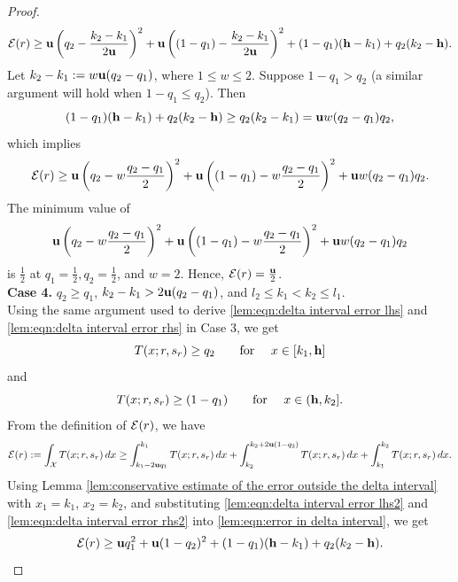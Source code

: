 \begin{proof}
        \[
        \mathcal{E}(r) \geq \mathbf{u} \left(q_2 - \frac{k_2 - k_1}{2\mathbf{u}}\right)^2 + \mathbf{u} \left((1 - q_1) - \frac{k_2 - k_1}{2\mathbf{u}}\right)^2 + (1 - q_1)(\mathbf{h} - k_1) + q_2(k_2 - \mathbf{h}).
        \]
        Let $k_2 - k_1 := w\mathbf{u} (q_2 - q_1)$, where $1 \leq w \leq 2$.
        Suppose $1 - q_1 > q_2$ (a similar argument will hold when $1 - q_1 \leq q_2$). Then
        \[
        (1 - q_1)(\mathbf{h} - k_1) + q_2(k_2 - \mathbf{h}) \geq q_2(k_2 - k_1) = \mathbf{u} w (q_2 - q_1) q_2,
        \]
        which implies
        \[
        \mathcal{E}(r) \geq \mathbf{u} \left(q_2 - w \frac{q_2 - q_1}{2}\right)^2 + \mathbf{u} \left((1 - q_1) - w \frac{q_2 - q_1}{2}\right)^2 + \mathbf{u} w (q_2 - q_1) q_2.
        \]
        The minimum value of
        \[
        \mathbf{u} \left(q_2 - w \frac{q_2 - q_1}{2}\right)^2 + \mathbf{u} \left((1 - q_1) - w \frac{q_2 - q_1}{2}\right)^2 + \mathbf{u} w (q_2 - q_1) q_2
        \]
        is $\frac{1}{2}$ at $q_1 = \frac{1}{2}, q_2 = \frac{1}{2}$, and $w = 2$. Hence, $\mathcal{E}(r) = \frac{\mathbf{u}}{2}$.\\
\textbf{Case 4. }{$q_2 \geq q_1$, $k_2 - k_1 > 2\mathbf{u}(q_2 - q_1)$, and $l_2 \leq k_1 < k_2 \leq l_1$.} \\
        Using the same argument used to derive \eqref{lem:eqn:delta interval error lhs} and \eqref{lem:eqn:delta interval error rhs} in Case 3, we get
        \begin{equation}\label{lem:eqn:delta interval error lhs2}
            T(x; r, s_r) \geq q_2 \quad \hbox{\quad for \quad} x \in [k_1, \mathbf{h}]
        \end{equation}
        and
        \begin{equation}\label{lem:eqn:delta interval error rhs2}
            T(x; r, s_r) \geq (1 - q_1) \quad \hbox{\quad for \quad} x \in (\mathbf{h}, k_2].
        \end{equation}
        From the definition of $\mathcal{E}(r)$, we have
        \begin{equation}\label{lem:eqn:error in delta interval}
            \mathcal{E}(r) := \int_{\mathcal{X}} T(x; r, s_r) \, dx \geq \int_{k_1 - 2\mathbf{u} q_1}^{k_1} T(x; r, s_r) \, dx + \int_{k_2}^{k_2 + 2\mathbf{u} (1 - q_2)} T(x; r, s_r) \, dx + \int_{k_1}^{k_2} T(x; r, s_r) \, dx.
        \end{equation}
        Using Lemma \ref{lem:conservative estimate of the error outside the delta interval} with $x_1 = k_1$, $x_2 = k_2$, and substituting \eqref{lem:eqn:delta interval error lhs2} and \eqref{lem:eqn:delta interval error rhs2} into \eqref{lem:eqn:error in delta interval}, we get
        \[
        \mathcal{E}(r) \geq \mathbf{u} q_1^2 + \mathbf{u} (1 - q_2)^2 + (1 - q_1)(\mathbf{h} - k_1) + q_2(k_2 - \mathbf{h}).
        \]

\end{proof}
